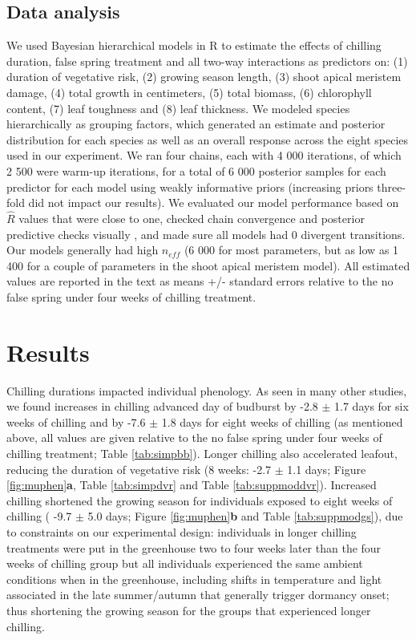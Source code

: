 \documentclass{article}\usepackage[]{graphicx}\usepackage[]{color}
\begin{document}
\subsection*{Data analysis} 
We used Bayesian hierarchical models \citep[with the brms package,][,version 2.3.1]{brms} in R \citep[][,version 3.3.1]{R} to estimate the effects of chilling duration, false spring treatment and all two-way interactions as predictors on: (1) duration of vegetative risk, (2) growing season length, (3) shoot apical meristem damage, (4) total growth in centimeters, (5) total biomass, (6) chlorophyll content, (7) leaf toughness and (8) leaf thickness. We modeled species hierarchically as grouping factors, which generated an estimate and posterior distribution for each species as well as an overall response across the eight species used in our experiment. We ran four chains, each with 4 000 iterations, of which 2 500 were warm-up iterations, for a total of 6 000 posterior samples for each predictor for each model using weakly informative priors (increasing priors three-fold did not impact our results). We evaluated our model performance based on $\hat{R}$ values that were close to one, checked chain convergence and posterior predictive checks visually \citep{BDA}, and made sure all models had 0 divergent transitions. Our models generally had high $n_{eff}$ (6 000 for most parameters, but as low as 1 400 for a couple of parameters in the shoot apical meristem model). All estimated values are reported in the text as means +/- standard errors relative to the no false spring under four weeks of chilling treatment.


\section*{Results} 
Chilling durations impacted individual phenology. As seen in many other studies, we found increases in chilling advanced day of budburst by -2.8 $\pm$ 1.7 days for six weeks of chilling and by -7.6 $\pm$ 1.8 days for eight weeks of chilling (as mentioned above, all values are given relative to the no false spring under four weeks of chilling treatment; Table \ref{tab:simpbb}). Longer chilling also accelerated leafout, reducing the duration of vegetative risk (8 weeks: -2.7 $\pm$ 1.1 days; Figure \ref{fig:muphen}\textbf{a}, Table \ref{tab:simpdvr} and Table \ref{tab:suppmoddvr}). Increased chilling shortened the growing season for individuals exposed to eight weeks of chilling ( -9.7 $\pm$ 5.0 days; Figure \ref{fig:muphen}\textbf{b} and Table \ref{tab:suppmodgs}), due to constraints on our experimental design: individuals in longer chilling treatments were put in the greenhouse two to four weeks later than the four weeks of chilling group but all individuals experienced the same ambient conditions when in the greenhouse, including shifts in temperature and light associated in the late summer/autumn that generally trigger dormancy onset; thus shortening the growing season for the groups that experienced longer chilling.
 
\end{document}

